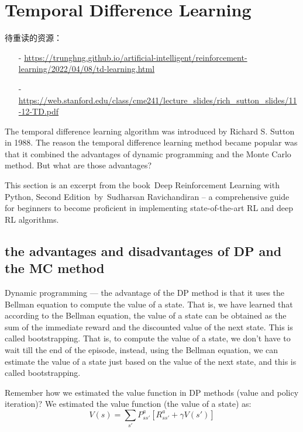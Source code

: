﻿

\section{Temporal Difference Learning}

待重读的资源：
\begin{itemize}
\setlength{\parskip}{0pt}
\item[-]
\url{https://trunghng.github.io/artificial-intelligent/reinforcement-learning/2022/04/08/td-learning.html}

\item[-]
\url{https://web.stanford.edu/class/cme241/lecture_slides/rich_sutton_slides/11-12-TD.pdf}
\end{itemize}

\cite{ODSC2020}

The temporal difference learning algorithm was introduced by Richard S. 
Sutton in 1988.  The reason the temporal difference learning method became 
popular was that it combined the advantages of dynamic programming and the 
Monte Carlo method. But what are those advantages? 

This section is an excerpt from the book  Deep Reinforcement Learning with 
Python, Second Edition  by  Sudharsan Ravichandiran – a comprehensive guide 
for beginners to become proficient in implementing state-of-the-art RL and 
deep RL algorithms.  

\subsection{the advantages and disadvantages of DP and the MC method}

Dynamic programming — the advantage of the DP method is that it uses the 
Bellman equation to compute the value of a state. That is, we have learned 
that according to the Bellman equation, the value of a state can be obtained 
as the sum of the immediate reward and the discounted value of the next 
state. This is called bootstrapping. That is, to compute the value of a 
state, we don't have to wait till the end of the episode, instead, using 
the Bellman equation, we can estimate the value of a state just based on 
the value of the next state, and this is called bootstrapping.  

Remember how we estimated the value function in DP methods (value and policy 
iteration)? We estimated the value function (the value of a state) as:
$$
V(s) = \sum_{s'}P_{ss'}^a\left[ R_{ss'}^a + \gamma V(s') \right]
$$

